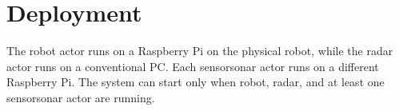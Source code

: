 \section{Deployment}
The robot actor runs on a Raspberry Pi on the physical robot, while the radar actor runs on a conventional PC. Each sensorsonar actor runs on a different Raspberry Pi. The system can start only when robot, radar, and at least one sensorsonar actor are running.